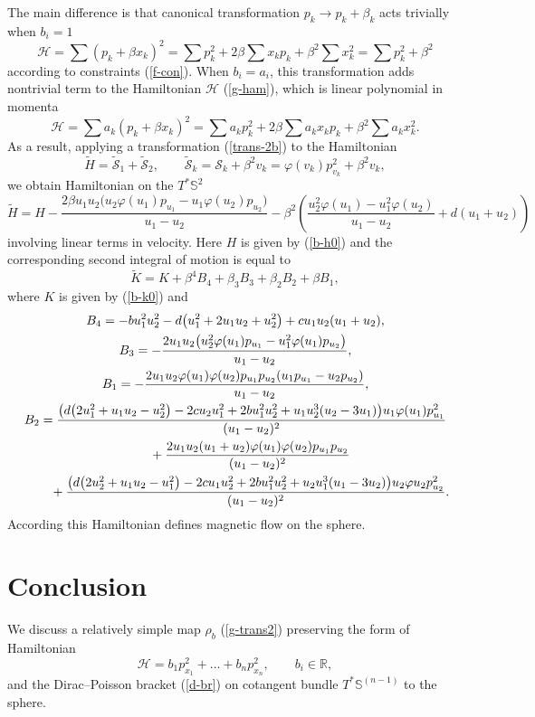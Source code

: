 \documentclass[pdftex]{sigma}
\numberwithin{equation}{section}
\begin{document}
The main difference is that canonical transformation $p_k\to p_k+\beta_k$ acts trivially when $b_i=1$
\[
\mathcal H=\sum (p_k+\beta x_k)^2=\sum p_k^2+2\beta\sum x_kp_k+\beta^2\sum x_k^2=\sum p_k^2+\beta^2
\]
according to constraints (\ref{f-con}). When $b_i=a_i$, this transformation adds nontrivial term to the Hamiltonian $\mathcal H$ (\ref{g-ham}), which is linear polynomial in momenta
\[
\mathcal H=\sum a_k (p_k+\beta x_k)^2=\sum a_k p_k^2+2\beta\sum a_kx_kp_k+\beta^2\sum a_kx_k^2 .
\]
As a result, applying a transformation (\ref{trans-2b}) to the Hamiltonian
\[
\tilde{H}=\tilde{\mathcal S}_1+\tilde{\mathcal{S}}_2 ,\qquad \tilde{\mathcal S}_k=\mathcal{S}_k+\beta^2 v_k=\varphi(v_k)p_{v_k}^2+\beta^2 v_k ,
\]
we obtain Hamiltonian on the $T^*\mathbb S^2$
\[
\tilde{H}=H-\frac{2\beta u_1u_2\big(u_2\varphi(u_1)p_{u_1} -u_1\varphi(u_2)p_{u_2}\big)}{u_1 - u_2}
-\beta^2\left(\frac{u_2^2\varphi(u_1)-u_1^2\varphi(u_2)}{u_1 - u_2} +d(u_1 + u_2)\right)
\]
involving linear terms in velocity. Here $H$ is given by (\ref{b-h0}) and the corresponding second integral of motion is equal to
\[
\tilde{K}=K+\beta^4 B_4+\beta_3B_3+\beta_2B_2+\beta B_1,
\]
where $K$ is given by (\ref{b-k0}) and
\begin{gather*}
B_4=-bu_1^2u_2^2 -d\big(u_1^2 + 2u_1u_2 + u_2^2\big) + cu_1u_2(u_1 + u_2) ,
\\
B_3=-\dfrac{2u_1u_2\big(u_2^2\varphi(u_1)p_{u_1} -u_1^2\varphi(u_1)p_{u_2}\big)}{u_1 - u_2} ,
\\
B_1=-\dfrac{2u_1u_2\varphi(u_1)\varphi(u_2)p_{u_1}p_{u_2}(u_1p_{u_1} - u_2p_{u_2})}{u_1 - u_2} ,
\\
B_2=
\frac{\big(d\big(2u_1^2 + u_1u_2 - u_2^2\big) - 2cu_2u_1^2 + 2bu_1^2u_2^2 + u_1u_2^3(u_2 - 3u_1)\big)u_1\varphi(u_1)p_{u_1}^2}{(u_1 - u_2)^2}\\
\hphantom{B_2=}{}
+\frac{2u_1u_2(u_1 + u_2)\varphi(u_1)\varphi(u_2)p_{u_1}p_{u_2}}{(u_1 - u_2)^2}\\
\hphantom{B_2=}{} +\frac{\big(d\big(2u_2^2+ u_1u_2 -u_1^2\big) - 2cu_1u_2^2 + 2bu_1^2u_2^2 + u_2u_1^3(u_1 - 3u_2)\big)u_2\varphi{u_2}p_{u_2}^2}{(u_1 - u_2)^2} .
\end{gather*}
According \cite{bm,dor,win00} this Hamiltonian defines magnetic flow on the sphere.

\section{Conclusion}
We discuss a relatively simple map $\rho_b$ (\ref{g-trans2}) preserving the form of Hamiltonian
\[
\mathcal H=b_1p_{x_1}^2+\dots +b_np_{x_n}^2 ,\qquad b_i\in\mathbb R ,
\]
and the Dirac--Poisson bracket (\ref{d-br}) on cotangent bundle $T^*\mathbb S^{(n-1)}$ to the sphere.
\end{document}
